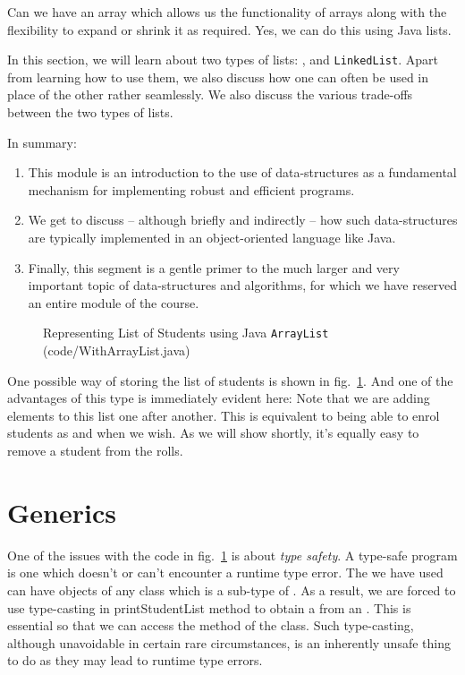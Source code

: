 \documentclass[12pt,a4paper]{article}
\begin{document}
Can we have an array which allows us the functionality of arrays along with the flexibility to expand or shrink it as required. Yes, we can do this using Java lists.

In this section, we will learn about two types of lists: \lstinline@ArrayList@, and \lstinline|LinkedList|. Apart from learning how to use them, we also discuss how one can often be used in place of the other rather seamlessly. We also discuss the various trade-offs between the two types of lists.

In summary:
\begin{enumerate}
	\item  This module is an introduction to the use of data-structures as a fundamental mechanism for implementing robust and efficient programs.
	\item We get to discuss -- although briefly and indirectly -- how such data-structures are typically implemented in an object-oriented language like Java.
	\item Finally, this segment is a gentle primer to the much larger and very important topic of data-structures and algorithms, for which we have reserved an entire module of the course.
	
\end{enumerate}

\begin{figure}[H]
	
	\caption{Representing List of Students using Java \lstinline|ArrayList| (code/WithArrayList.java)}
	\label{f:al}
\end{figure}

One possible way of storing the list of students is shown in fig.~\ref{f:al}. And one of the advantages of this type is immediately evident here: Note that we are adding elements to this list one after another. This is equivalent to being able to enrol students as and when we wish. As we will show shortly, it's equally easy to remove a student from the rolls.

\section{Generics}
One of the issues with the code in fig.~\ref{f:al} is about \emph{type safety}. A type-safe program is one which doesn't or can't encounter a runtime type error. The \lstinline@ArrayList@ we have used can have objects of any class which is a sub-type of \lstinline@Object@. As a result, we are forced to use type-casting in printStudentList method to obtain a \lstinline@Student@ from an \lstinline@Object@. This is essential so that we can access the \lstinline@getDetails@ method of the \lstinline@Student@ class. Such type-casting, although unavoidable in certain rare circumstances, is an inherently unsafe thing to do as they may lead to runtime type errors.
\end{document}
